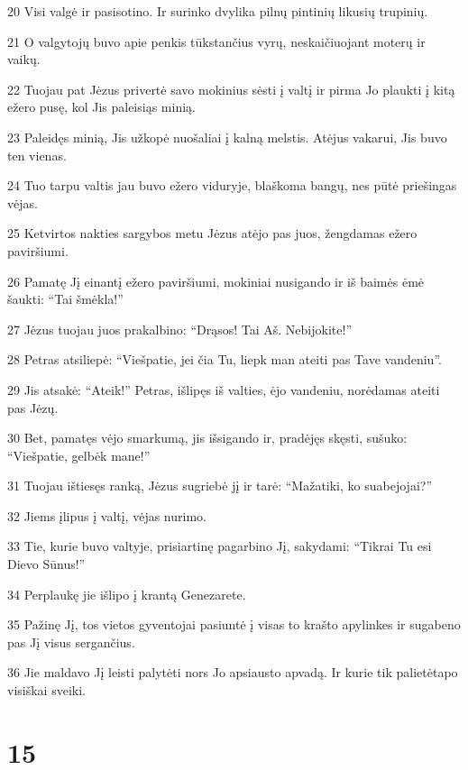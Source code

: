 \par 20 Visi valgė ir pasisotino. Ir surinko dvylika pilnų pintinių likusių trupinių. 
\par 21 O valgytojų buvo apie penkis tūkstančius vyrų, neskaičiuojant moterų ir vaikų. 
\par 22 Tuojau pat Jėzus privertė savo mokinius sėsti į valtį ir pirma Jo plaukti į kitą ežero pusę, kol Jis paleisiąs minią. 
\par 23 Paleidęs minią, Jis užkopė nuošaliai į kalną melstis. Atėjus vakarui, Jis buvo ten vienas. 
\par 24 Tuo tarpu valtis jau buvo ežero viduryje, blaškoma bangų, nes pūtė priešingas vėjas. 
\par 25 Ketvirtos nakties sargybos metu Jėzus atėjo pas juos, žengdamas ežero paviršiumi. 
\par 26 Pamatę Jį einantį ežero paviršiumi, mokiniai nusigando ir iš baimės ėmė šaukti: “Tai šmėkla!” 
\par 27 Jėzus tuojau juos prakalbino: “Drąsos! Tai Aš. Nebijokite!” 
\par 28 Petras atsiliepė: “Viešpatie, jei čia Tu, liepk man ateiti pas Tave vandeniu”. 
\par 29 Jis atsakė: “Ateik!” Petras, išlipęs iš valties, ėjo vandeniu, norėdamas ateiti pas Jėzų. 
\par 30 Bet, pamatęs vėjo smarkumą, jis išsigando ir, pradėjęs skęsti, sušuko: “Viešpatie, gelbėk mane!” 
\par 31 Tuojau ištiesęs ranką, Jėzus sugriebė jį ir tarė: “Mažatiki, ko suabejojai?” 
\par 32 Jiems įlipus į valtį, vėjas nurimo. 
\par 33 Tie, kurie buvo valtyje, prisiartinę pagarbino Jį, sakydami: “Tikrai Tu esi Dievo Sūnus!” 
\par 34 Perplaukę jie išlipo į krantą Genezarete. 
\par 35 Pažinę Jį, tos vietos gyventojai pasiuntė į visas to krašto apylinkes ir sugabeno pas Jį visus sergančius. 
\par 36 Jie maldavo Jį leisti palytėti nors Jo apsiausto apvadą. Ir kurie tik palietė­tapo visiškai sveiki.



\chapter{15}


